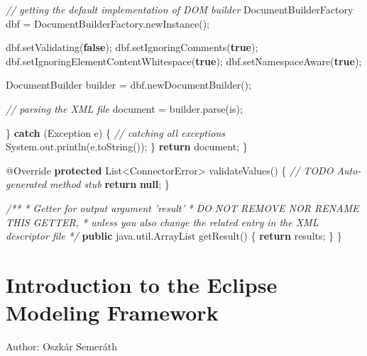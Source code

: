 \documentclass[]{report}
\newenvironment{Shaded}{}{}
\newcommand{\KeywordTok}[1]{\textcolor[rgb]{0.00,0.44,0.13}{\textbf{{#1}}}}
\newcommand{\CommentTok}[1]{\textcolor[rgb]{0.38,0.63,0.69}{\textit{{#1}}}}
\newcommand{\FunctionTok}[1]{\textcolor[rgb]{0.02,0.16,0.49}{{#1}}}
\newcommand{\NormalTok}[1]{{#1}}
\begin{document}
\begin{enumerate}
\begin{Shaded}
\begin{Highlighting}[]
      \CommentTok{// getting the default implementation of DOM builder}
      \NormalTok{DocumentBuilderFactory dbf = DocumentBuilderFactory.}\FunctionTok{newInstance}\NormalTok{();}

      \NormalTok{dbf.}\FunctionTok{setValidating}\NormalTok{(}\KeywordTok{false}\NormalTok{);}
      \NormalTok{dbf.}\FunctionTok{setIgnoringComments}\NormalTok{(}\KeywordTok{true}\NormalTok{);}
      \NormalTok{dbf.}\FunctionTok{setIgnoringElementContentWhitespace}\NormalTok{(}\KeywordTok{true}\NormalTok{);}
      \NormalTok{dbf.}\FunctionTok{setNamespaceAware}\NormalTok{(}\KeywordTok{true}\NormalTok{);}

      \NormalTok{DocumentBuilder builder = dbf.}\FunctionTok{newDocumentBuilder}\NormalTok{();}

      \CommentTok{// parsing the XML file}
      \NormalTok{document = builder.}\FunctionTok{parse}\NormalTok{(is);}

    \NormalTok{\} }\KeywordTok{catch} \NormalTok{(Exception e) \{}
      \CommentTok{// catching all exceptions}
      \NormalTok{System.}\FunctionTok{out}\NormalTok{.}\FunctionTok{println}\NormalTok{(e.}\FunctionTok{toString}\NormalTok{());}
    \NormalTok{\}}
    \KeywordTok{return} \NormalTok{document;}
  \NormalTok{\}}

  \FunctionTok{@Override}
  \KeywordTok{protected} \NormalTok{List<ConnectorError> }\FunctionTok{validateValues}\NormalTok{() \{}
    \CommentTok{// TODO Auto-generated method stub}
    \KeywordTok{return} \KeywordTok{null}\NormalTok{;}
  \NormalTok{\}}

  \CommentTok{/**}
\CommentTok{   * Getter for output argument 'result'}
\CommentTok{   * DO NOT REMOVE NOR RENAME THIS GETTER, }
\CommentTok{   * unless you also change the related entry in the XML descriptor file}
\CommentTok{   */}
  \KeywordTok{public} \NormalTok{java.}\FunctionTok{util}\NormalTok{.}\FunctionTok{ArrayList} \FunctionTok{getResult}\NormalTok{() \{}
    \KeywordTok{return} \NormalTok{results;}
  \NormalTok{\}}
\NormalTok{\}}
\end{Highlighting}
\end{Shaded}
\end{enumerate}

\chapter{Introduction to the Eclipse Modeling Framework}

Author: Oszkár Semeráth
\end{document}
